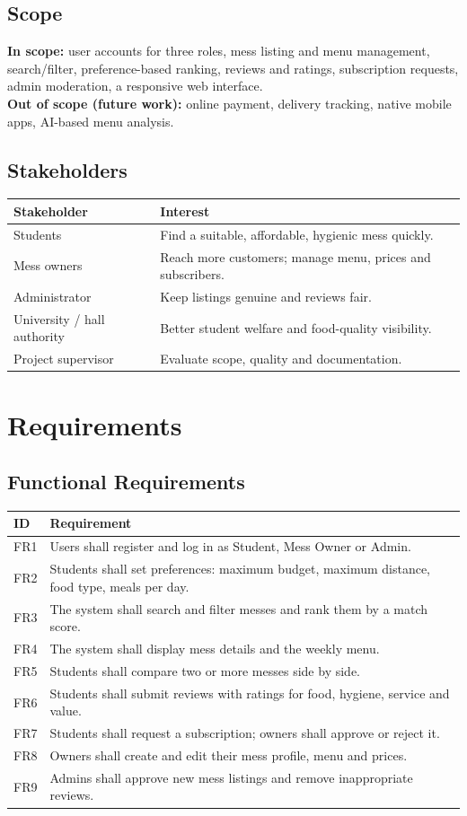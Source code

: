 \documentclass[11pt,a4paper]{article}
\begin{document}
\subsection{Scope}
\textbf{In scope:} user accounts for three roles, mess listing and menu management, search/filter, preference-based ranking, reviews and ratings, subscription requests, admin moderation, a responsive web interface.\\
\textbf{Out of scope (future work):} online payment, delivery tracking, native mobile apps, AI-based menu analysis.

\subsection{Stakeholders}
\begin{tabular}{@{}p{3cm}p{12cm}@{}}\toprule
\textbf{Stakeholder} & \textbf{Interest}\\\midrule
Students & Find a suitable, affordable, hygienic mess quickly.\\
Mess owners & Reach more customers; manage menu, prices and subscribers.\\
Administrator & Keep listings genuine and reviews fair.\\
University / hall authority & Better student welfare and food-quality visibility.\\
Project supervisor & Evaluate scope, quality and documentation.\\\bottomrule
\end{tabular}

\section{Requirements}
\subsection{Functional Requirements}
\begin{longtable}{@{}p{1.2cm}p{13.5cm}@{}}\toprule
\textbf{ID} & \textbf{Requirement}\\\midrule\endhead
FR1 & Users shall register and log in as Student, Mess Owner or Admin.\\
FR2 & Students shall set preferences: maximum budget, maximum distance, food type, meals per day.\\
FR3 & The system shall search and filter messes and rank them by a match score.\\
FR4 & The system shall display mess details and the weekly menu.\\
FR5 & Students shall compare two or more messes side by side.\\
FR6 & Students shall submit reviews with ratings for food, hygiene, service and value.\\
FR7 & Students shall request a subscription; owners shall approve or reject it.\\
FR8 & Owners shall create and edit their mess profile, menu and prices.\\
FR9 & Admins shall approve new mess listings and remove inappropriate reviews.\\\bottomrule
\end{longtable}
\end{document}
